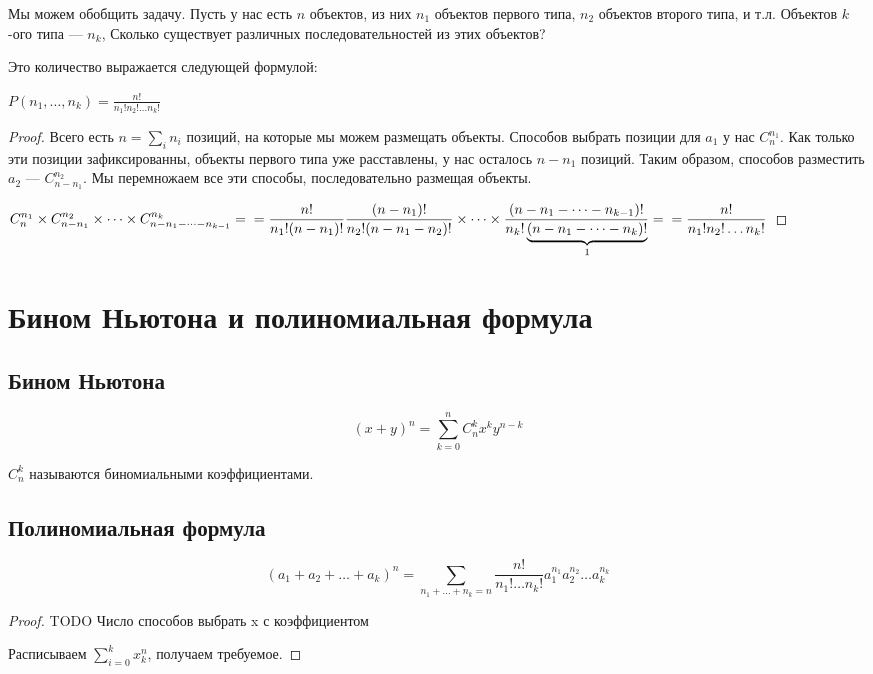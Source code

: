 Мы можем обобщить задачу. Пусть у нас есть $n$ объектов, из них $n_1$ объектов первого типа, $n_2$ объектов второго типа, и т.л. Объектов $k$-ого типа --- $n_k$, Сколько существует различных последовательностей  из этих объектов?

\begin{thm} Это количество выражается следующей формулой:

$ P(n_1, \dots, n_k) = \frac{n!}{n_1 ! n_2! \dots n_k !} $
\end{thm}

\begin{proof}
Всего есть $n= \sum \limits _i n_i$ позиций, на которые мы можем размещать объекты. Способов выбрать позиции для $a_1$ у нас $C^{n_1}_n$. Как только эти позиции зафиксированны, объекты первого типа уже расставлены, у нас осталось $n-n_1$ позиций. Таким образом, способов разместить $a_2$ --- $C^{n_2} _{n-n_1}$. Мы перемножаем все эти способы, последовательно размещая объекты.

$\displaystyle 
C^{n_1}_n \times C^{n_2}_{n-n_1} \times \dots \times C^{n_k}_{n-n_1-\dots-n_{k-1}}= \\
= \frac {n!} {n_1! (n-n_1)!} \frac {(n-n_1)!} {n_2! (n- n_1 - n_2)!} \times \dots \times \frac {(n-n_1 - \dots - n_{k-1})!} {n_k! 
  \underbrace{(n-n_1 - \dots - n_k)!} _1 } = \\
= \frac {n!} {n_1! n_2! \dots n_k!}
$
\end{proof}





\section{Бином Ньютона и полиномиальная формула}

\subsection{Бином Ньютона}

\[ (x+y)^n=\sum \limits_{k=0}^n C^k_n x^k y^{n-k}  \] 

$C^k_n$ называются биномиальными коэффициентами.

\subsection{Полиномиальная формула} 
\[\displaystyle
(a_1 + a_2 + \dots + a_k)^n = \sum \limits _{n_1+\dots + n_k = n} \frac {n!} {n_1! \dots n_k!} a_1^{n_1} a_2^{n_2} \dots a_k^{n_k} 
\]
\begin{proof}   
TODO Число способов выбрать x с коэффициентом 

Расписываем $ \sum\limits_{i=0}^k x_k ^n $, получаем требуемое. 
\end{proof}


